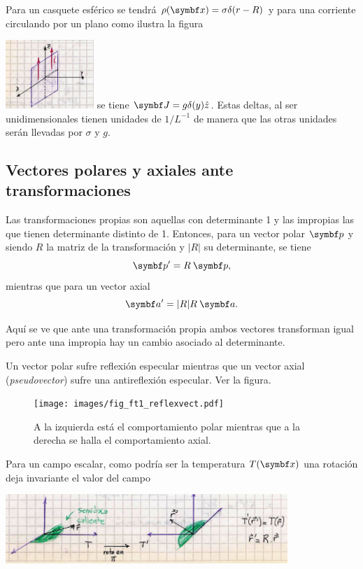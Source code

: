 \documentclass[10pt,oneside]{CBFT_book}
\begin{document}
Para un casquete esférico se tendrá $\rho(\vb{x}) = \sigma \delta(r-R) $ y para una corriente
circulando por un plano como ilustra la figura

\includegraphics[width=0.25\textwidth]{images/fig_ft1_deltas_ejemplos.jpg}
se tiene $\vb{J} = g \delta(y) \hat{z}$. Estas deltas, al ser unidimensionales tienen unidades
de $1/L^{-1}$ de manera que las otras unidades serán llevadas por $\sigma$ y $g$.

\subsection{Vectores polares y axiales ante transformaciones}

Las transformaciones propias son aquellas con determinante 1 y las impropias las que tienen determinante
distinto de 1.
Entonces, para un vector polar $\vb{p}$ y siendo $R$ la matriz de la transformación y $|R|$ su determinante, 
se tiene 
\[
	\vb{p}' = R \: \vb{p},
\]
mientras que para un vector axial 
\[
	\vb{a}' = |R| R \: \vb{a}.
\]

Aquí se ve que ante una transformación propia ambos vectores transforman igual pero ante una impropia 
hay un cambio asociado al determinante.

Un vector polar sufre reflexión especular mientras que un vector axial ({\it pseudovector})
sufre una antireflexión especular. Ver la figura.

\begin{figure}[htb]
	\begin{center}
	\texttt{[image: images/fig\_ft1\_reflexvect.pdf]}	 
	\end{center}
	\caption{A la izquierda está el comportamiento polar mientras que a la derecha
	se halla el comportamiento axial.}
\end{figure} 

Para un campo escalar, como podría ser la temperatura $T(\vb{x})$ una rotación deja invariante el valor
del campo 

\includegraphics[width=0.8\textwidth]{images/fig_ft1_rotacion_escalar.jpg}
\end{document}
